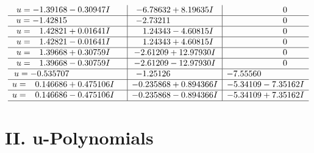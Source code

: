 \documentclass[1p]{elsarticle_modified}
\theoremstyle{definition}
\begin{document}
$$\begin{array}{c|c|c}
\begin{aligned}
u &= -1.39168 - 0.30947 I\end{aligned}
 & -6.78632 + 8.19635 I & \phantom{-0.000000 } 0 \\ \hline\begin{aligned}
u &= -1.42815\phantom{ +0.000000I}\end{aligned}
 & -2.73211\phantom{ +0.000000I} & \phantom{-0.000000 } 0 \\ \hline\begin{aligned}
u &= \phantom{-}1.42821 + 0.01641 I\end{aligned}
 & \phantom{-}1.24343 - 4.60815 I & \phantom{-0.000000 } 0 \\ \hline\begin{aligned}
u &= \phantom{-}1.42821 - 0.01641 I\end{aligned}
 & \phantom{-}1.24343 + 4.60815 I & \phantom{-0.000000 } 0 \\ \hline\begin{aligned}
u &= \phantom{-}1.39668 + 0.30759 I\end{aligned}
 & -2.61209 + 12.97930 I & \phantom{-0.000000 } 0 \\ \hline\begin{aligned}
u &= \phantom{-}1.39668 - 0.30759 I\end{aligned}
 & -2.61209 - 12.97930 I & \phantom{-0.000000 } 0 \\ \hline\begin{aligned}
u &= -0.535707\phantom{ +0.000000I}\end{aligned}
 & -1.25126\phantom{ +0.000000I} & -7.55560\phantom{ +0.000000I} \\ \hline\begin{aligned}
u &= \phantom{-}0.146686 + 0.475106 I\end{aligned}
 & -0.235868 + 0.894366 I & -5.34109 - 7.35162 I \\ \hline\begin{aligned}
u &= \phantom{-}0.146686 - 0.475106 I\end{aligned}
 & -0.235868 - 0.894366 I & -5.34109 + 7.35162 I\\
 \hline 
 \end{array}$$\newpage
\newpage\renewcommand{\arraystretch}{1}
\centering \section*{ II. u-Polynomials}
\end{document}
